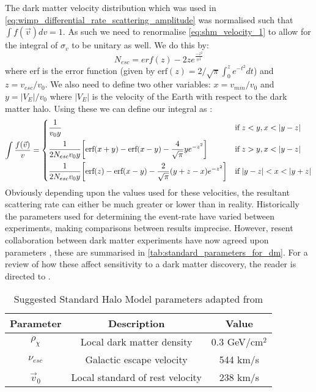 \par
The dark matter velocity distribution which was used in \autoref{eq:wimp_differential_rate_scattering_amplitude} was normalised such that $\int f(\vec{v}) dv = 1$.
As such we need to renormalise \autoref{eq:shm_velocity_1} to allow for the integral of $\sigma_{v}$ to be unitary as well.
We do this by:
\begin{equation}
    N_{esc} = erf(z) - 2z e^\frac{-z^2}{\pi^{\frac{1}{2}}}
\end{equation}
where erf is the error function (given by $\text{erf}(z) = 2/\sqrt{\pi}\int^{z}_{0} e^{-t^2} dt$) and $z=v_{esc}/v_0$.
We also need to define two other variables: $x=v_{min}/v_{0}$ and $y=|V_E|/v_0$ where $|V_E|$ is the velocity of the Earth with respect to the dark matter halo.
Using these we can define our integral as \cite{shm_derivation_ref}:
\begin{equation}
\begin{split}
 \int \frac{f(\vec{v})}{v} = 
\begin{dcases}
\frac{1}{v_0 y}  & \text{if}\; z<y,x<|y-z| \\
\frac{1}{2N_{esc} v_{0}y} \bigg[\text{erf}(x+y) - \text{erf}(x-y) - \frac{4}{\sqrt{\pi}}ye^{-z^2} \bigg] & \text{if}\; z>y, x<|y-z| \\
\frac{1}{2N_{esc} v_{0}y} \bigg[\text{erf}(z) - \text{erf}(x-y) - \frac{2}{\sqrt{\pi}}(y + z - x)e^{-z^2} \bigg] & \text{if}\; |y-z|<x<|y+z|
\end{dcases}
\end{split}
\label{eq:shm_velocity_2}
\end{equation}
Obviously depending upon the values used for these velocities, the resultant scattering rate can either be much greater or lower than in reality.
Historically the parameters used for determining the event-rate have varied between experiments, making comparisons between results imprecise.
However, resent collaboration between dark matter experiments have now agreed upon parameters \cite{standard_halo_model_conventions_ref}, these are summarised in \autoref{tab:standard_parameters_for_dm}.
For a review of how these affect sensitivity to a dark matter discovery, the reader is directed to \cite{dm_velocity_effects_on_limits_ref}.

\begin{table}[!htbp]
    \centering
    \begin{tabular}{c|c|c}
        Parameter                               & Description                       & Value         \\ \hline
        $\rho_{\chi}$                           & Local dark matter density         & 0.3 GeV/cm$^2$ \cite{shm_derivation_ref}           \\
        $\nu_{esc}$                             & Galactic escape velocity          & 544 km/s  \cite{dm_v_esc_ref}           \\
        $\Vec{v}_0$                             & Local standard of rest velocity   & 238 km/s   \cite{dm_v_0_ref}           
    \end{tabular}
    \caption{Suggested Standard Halo Model parameters adapted from \cite{standard_halo_model_conventions_ref}}
    \label{tab:standard_parameters_for_dm}
\end{table}

